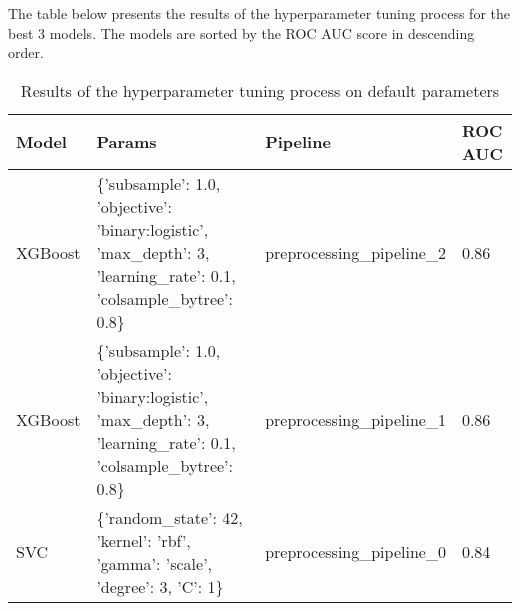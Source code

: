 \documentclass{article}%
\begin{document}
%
The table below presents the results of the hyperparameter tuning process for the best 3 models. The models are sorted by the ROC AUC score in descending order.%


\begin{table}[H]%
\begin{center}%
\begin{tabular}{p{15mm} p{50mm} p{60mm} p{10mm}}%
\hline%
\textbf{Model}&\textbf{Params}&\textbf{Pipeline}&\textbf{ROC AUC}\\%
\hline%
XGBoost&\{'subsample': 1.0, 'objective': 'binary:logistic', 'max\_depth': 3, 'learning\_rate': 0.1, 'colsample\_bytree': 0.8\}&preprocessing\_pipeline\_2&0.86\\%
XGBoost&\{'subsample': 1.0, 'objective': 'binary:logistic', 'max\_depth': 3, 'learning\_rate': 0.1, 'colsample\_bytree': 0.8\}&preprocessing\_pipeline\_1&0.86\\%
SVC&\{'random\_state': 42, 'kernel': 'rbf', 'gamma': 'scale', 'degree': 3, 'C': 1\}&preprocessing\_pipeline\_0&0.84\\%
\hline%
\end{tabular}%
\end{center}%
\caption{Results of the hyperparameter tuning process on default parameters}%
\end{table}

%
\end{document}
